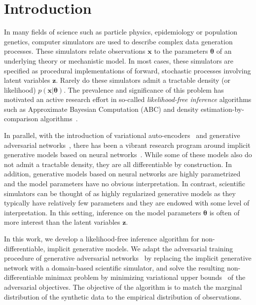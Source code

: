 \documentclass{article}
\newcommand{\bftheta}{{\bm \theta}}
\newcommand{\bfx}{\mathbf{x}}
\newcommand{\bfz}{\mathbf{z}}
\theoremstyle{plain}
\begin{document}

\section{Introduction}

In many fields of science such as particle physics, epidemiology  or
population genetics, computer simulators are used to describe complex data
generation processes. These simulators relate observations $\bfx$ to the
parameters $\bftheta$ of an underlying theory or mechanistic model. In most
cases, these simulators are specified as procedural implementations of forward,
stochastic processes involving latent variables $\bfz$. Rarely do these
simulators admit a tractable density (or likelihood) $p(\bfx | \bftheta)$. The
prevalence and significance of this problem has motivated an active research
effort in so-called \textit{likelihood-free inference} algorithms such as
Approximate Bayesian Computation (ABC) and density estimation-by-comparison
algorithms~\cite{beaumont2002approximate, marjoram2003markov,
sisson2007sequential, sisson2011likelihood, marin2012approximate,
cranmer2015approximating}.

In parallel, with the introduction of variational
auto-encoders~\cite{DBLP:journals/corr/KingmaW13} and generative adversarial
networks~\cite{goodfellow2014generative}, there has been a vibrant research
program around implicit generative models based on neural
networks~\cite{2016arXiv161003483M}.  While some of these models
also do not admit a tractable density, they are all differentiable by construction.
In addition, generative models based on neural networks are highly parametrized and the model
parameters have no obvious interpretation. In contrast, scientific simulators
can be thought of as highly regularized generative models as they typically have
relatively few parameters and they are endowed with some level of
interpretation. In this setting, inference on the model parameters $\bftheta$ is
often of more interest than the latent variables $\bfz$.

In this work, we develop a likelihood-free inference algorithm
for non-differentiable, implicit generative models.
We adapt the adversarial
training procedure of generative adversarial
networks~\cite{goodfellow2014generative} by replacing the implicit generative
network with a domain-based scientific simulator, and solve the resulting
non-differentiable minimax problem by minimizing variational upper
bounds~\cite{2011arXiv1106.4487W,2012arXiv1212.4507S} of the adversarial
objectives.
The objective of the algorithm is to match the marginal distribution of
the synthetic data to the empirical distribution of observations.
\end{document}
